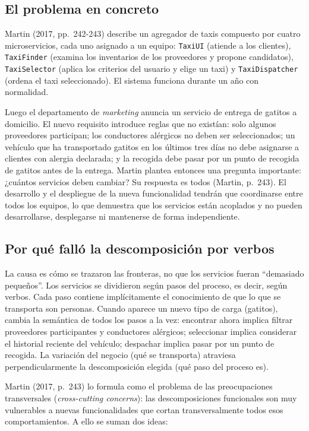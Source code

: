 \documentclass[12pt,a4paper]{article}
\begin{document}
\subsection{El problema en concreto}

Martin (2017, pp.~242-243) describe un agregador de taxis compuesto por cuatro microservicios, cada uno asignado a un equipo: \texttt{TaxiUI} (atiende a los clientes), \texttt{TaxiFinder} (examina los inventarios de los proveedores y propone candidatos), \texttt{TaxiSelector} (aplica los criterios del usuario y elige un taxi) y \texttt{TaxiDispatcher} (ordena el taxi seleccionado). El sistema funciona durante un año con normalidad.

Luego el departamento de \emph{marketing} anuncia un servicio de entrega de gatitos a domicilio. El nuevo requisito introduce reglas que no existían: solo algunos proveedores participan; los conductores alérgicos no deben ser seleccionados; un vehículo que ha transportado gatitos en los últimos tres días no debe asignarse a clientes con alergia declarada; y la recogida debe pasar por un punto de recogida de gatitos antes de la entrega. Martin plantea entonces una pregunta importante: ¿cuántos servicios deben cambiar? Su respuesta es todos (Martin, p.~243). El desarrollo y el despliegue de la nueva funcionalidad tendrán que coordinarse entre todos los equipos, lo que demuestra que los servicios están acoplados y no pueden desarrollarse, desplegarse ni mantenerse de forma independiente.

\subsection{Por qué falló la descomposición por verbos}

La causa es cómo se trazaron las fronteras, no que los servicios fueran ``demasiado pequeños''. Los servicios se dividieron según pasos del proceso, es decir, según verbos. Cada paso contiene implícitamente el conocimiento de que lo que se transporta son personas. Cuando aparece un nuevo tipo de carga (gatitos), cambia la semántica de todos los pasos a la vez: encontrar ahora implica filtrar proveedores participantes y conductores alérgicos; seleccionar implica considerar el historial reciente del vehículo; despachar implica pasar por un punto de recogida. La variación del negocio (qué se transporta) atraviesa perpendicularmente la descomposición elegida (qué paso del proceso es).

Martin (2017, p.~243) lo formula como el problema de las preocupaciones transversales (\emph{cross-cutting concerns}): las descomposiciones funcionales son muy vulnerables a nuevas funcionalidades que cortan transversalmente todos esos comportamientos. A ello se suman dos ideas:
\end{document}
